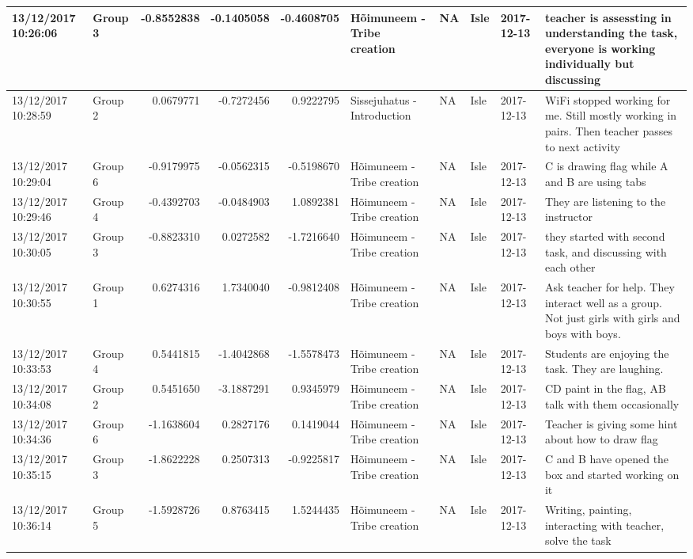 \documentclass[]{article}
\begin{document}
\begin{tabular}{l|l|r|r|r|l|l|l|l|l}
\hline
13/12/2017 10:26:06 & Group 3 & -0.8552838 & -0.1405058 & -0.4608705 & Hõimuneem - Tribe creation & NA & Isle & 2017-12-13 & teacher is assessting in understanding the task, everyone is working individually but discussing\\
\hline
13/12/2017 10:28:59 & Group 2 & 0.0679771 & -0.7272456 & 0.9222795 & Sissejuhatus - Introduction & NA & Isle & 2017-12-13 & WiFi stopped working for me. Still mostly working in pairs. Then teacher passes to next activity\\
\hline
13/12/2017 10:29:04 & Group 6 & -0.9179975 & -0.0562315 & -0.5198670 & Hõimuneem - Tribe creation & NA & Isle & 2017-12-13 & C is drawing flag while A and B are using tabs\\
\hline
13/12/2017 10:29:46 & Group 4 & -0.4392703 & -0.0484903 & 1.0892381 & Hõimuneem - Tribe creation & NA & Isle & 2017-12-13 & They are listening to the instructor\\
\hline
13/12/2017 10:30:05 & Group 3 & -0.8823310 & 0.0272582 & -1.7216640 & Hõimuneem - Tribe creation & NA & Isle & 2017-12-13 & they started with second task, and discussing with each other\\
\hline
13/12/2017 10:30:55 & Group 1 & 0.6274316 & 1.7340040 & -0.9812408 & Hõimuneem - Tribe creation & NA & Isle & 2017-12-13 & Ask teacher for help. They interact well as a group. Not just girls with girls and boys with boys.\\
\hline
13/12/2017 10:33:53 & Group 4 & 0.5441815 & -1.4042868 & -1.5578473 & Hõimuneem - Tribe creation & NA & Isle & 2017-12-13 & Students are enjoying the task. They are laughing.\\
\hline
13/12/2017 10:34:08 & Group 2 & 0.5451650 & -3.1887291 & 0.9345979 & Hõimuneem - Tribe creation & NA & Isle & 2017-12-13 & CD paint in the flag, AB talk with them occasionally\\
\hline
13/12/2017 10:34:36 & Group 6 & -1.1638604 & 0.2827176 & 0.1419044 & Hõimuneem - Tribe creation & NA & Isle & 2017-12-13 & Teacher is giving some hint about how to draw flag\\
\hline
13/12/2017 10:35:15 & Group 3 & -1.8622228 & 0.2507313 & -0.9225817 & Hõimuneem - Tribe creation & NA & Isle & 2017-12-13 & C and B have opened the box and started working on it\\
\hline
13/12/2017 10:36:14 & Group 5 & -1.5928726 & 0.8763415 & 1.5244435 & Hõimuneem - Tribe creation & NA & Isle & 2017-12-13 & Writing, painting, interacting with teacher, solve the task\\

\end{tabular}
\end{document}
